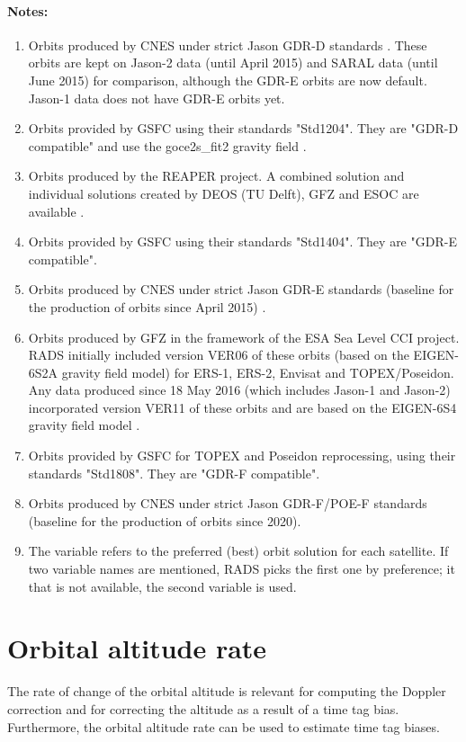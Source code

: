 \documentclass[a4paper,11pt,openany,natbib,nomargin]{thesis}
\newenvironment{notes}[1][Notes:]{\FloatBarrier\paragraph{#1}\begin{enumerate}}{\end{enumerate}}
\begin{document}
\begin{notes}
\item Orbits produced by CNES under strict Jason GDR-D standards \citep{ids2011}. These orbits are kept on Jason-2 data (until April 2015) and SARAL data (until June 2015) for comparison, although the GDR-E orbits are now default. Jason-1 data does not have GDR-E orbits yet.\label{item:alt_gdrd}
\item Orbits provided by GSFC using their standards "Std1204". They are "GDR-D compatible" and use the goce2s\_fit2 gravity field \citep{lemoine2013}.\label{item:alt_std1204}
\item Orbits produced by the REAPER project. A combined solution and individual solutions created by DEOS (TU Delft), GFZ and ESOC are available \citep{rudenko2011}.\label{item:alt_reaper}
\item Orbits provided by GSFC using their standards "Std1404". They are "GDR-E compatible".\label{item:alt_std1404}
\item Orbits produced by CNES under strict Jason GDR-E standards (baseline for the production of orbits since April 2015) \citep{ids2015}.\label{item:alt_gdre}
\item Orbits produced by GFZ in the framework of the ESA Sea Level CCI project. RADS initially included version VER06 of these orbits (based on the EIGEN-6S2A gravity field model) \citep{rudenko2014} for ERS-1, ERS-2, Envisat and TOPEX/Poseidon. Any data produced since 18 May 2016 (which includes Jason-1 and Jason-2) incorporated version VER11 of these orbits and are based on the EIGEN-6S4 gravity field model \citep{rudenko2015,rudenko2016}.\label{item:alt_slcci}
\item Orbits provided by GSFC for TOPEX and Poseidon reprocessing, using their standards "Std1808". They are "GDR-F compatible".\label{item:alt_std1808}
\item Orbits produced by CNES under strict Jason GDR-F/POE-F standards (baseline for the production of orbits since 2020).\label{item:alt_gdrf}
\item The variable  refers to the preferred (best) orbit solution for each satellite. If two variable names are mentioned, RADS picks the first one by preference; it that is not available, the second variable is used.\label{item:alt}
\end{notes}

\section{Orbital altitude rate}
The rate of change of the orbital altitude is relevant for computing the Doppler correction and for correcting the altitude as a result of a time tag bias. Furthermore, the orbital altitude rate can be used to estimate time tag biases.
\end{document}
